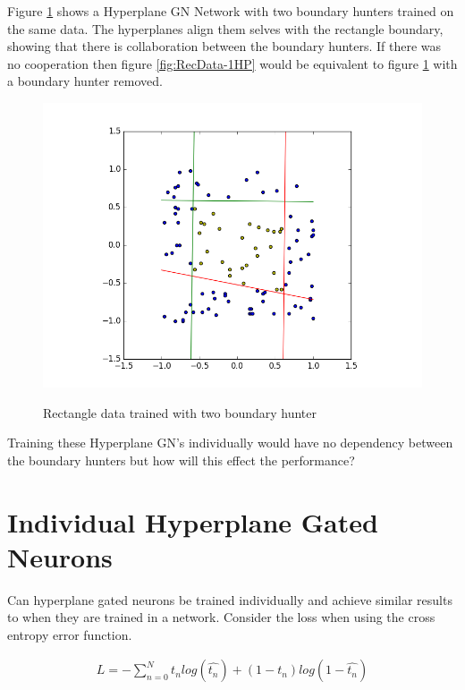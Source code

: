 \documentclass[notitlepage]{report}
\theoremstyle{definition}
\begin{document}
Figure \ref{fig:RecData-2HP} shows a Hyperplane GN Network with two boundary hunters trained on the same data. The hyperplanes align them selves with the rectangle boundary, showing that there is collaboration between the boundary hunters. If there was no cooperation then figure \ref{fig:RecData-1HP} would be equivalent to figure \ref{fig:RecData-2HP} with a boundary hunter removed.

\begin{figure}[H]
  \centering
  \begin{minipage}[b]{0.8\textwidth}
    \includegraphics[width=\textwidth]{RecData-2HP.png}
    \caption{}
    \label{fig:RecData-2HP}
  \end{minipage}
  \hfill

Rectangle data trained with two boundary hunter
\end{figure}

Training these Hyperplane GN's individually would have no dependency between the boundary hunters but how will this effect the performance?

\chapter{Individual Hyperplane Gated Neurons}
Can hyperplane gated neurons be trained individually and achieve similar results to when they are trained in a network. Consider the loss when using the cross entropy error function.

\begin{align*}
	L = -\sum_{n=0}^N t_n log(\widehat{t_n}) + (1 - t_n) log(1 - \widehat{t_n})
\end{align*}
\end{document}
